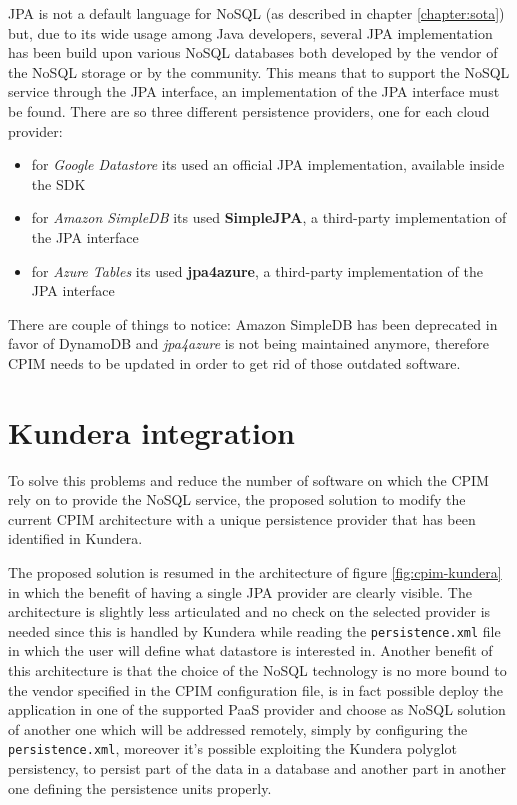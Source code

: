 \newparagraph JPA is not a default language for NoSQL (as described in chapter \ref{chapter:sota}) but, due to its wide usage among Java developers, several JPA implementation has been build upon various NoSQL databases both developed by the vendor of the NoSQL storage or by the community.
This means that to support the NoSQL service through the JPA interface, an implementation of the JPA interface must be found. There are so three different persistence providers, one for each cloud provider:
\begin{itemize}
\item for \textit{Google Datastore} its used an official JPA implementation, available inside the SDK
\item for \textit{Amazon SimpleDB} its used \textbf{SimpleJPA}, a third-party implementation of the JPA interface
\item for \textit{Azure Tables} its used \textbf{jpa4azure}, a third-party implementation of the JPA interface
\end{itemize}

\noindent There are couple of things to notice: Amazon SimpleDB has been deprecated in favor of DynamoDB and \textit{jpa4azure} is not being maintained anymore, therefore CPIM needs to be updated in order to get rid of those outdated software.

\section{Kundera integration}
To solve this problems and reduce the number of software on which the CPIM rely on to provide the NoSQL service, the proposed solution  to modify the current CPIM architecture with a unique persistence provider that has been identified in Kundera.

\newparagraph The proposed solution is resumed in the architecture of figure \ref{fig:cpim-kundera} in which the benefit of having a single JPA provider are clearly visible. The architecture is slightly less articulated and no check on the selected provider is needed since this is handled by Kundera while reading the \texttt{persistence.xml} file in which the user will define what datastore is interested in.
Another benefit of this architecture is that the choice of the NoSQL technology is no more bound to the vendor specified in the CPIM configuration file, is in fact possible deploy the application in one of the supported PaaS provider and choose as NoSQL solution of another one which will be addressed remotely, simply by configuring the \texttt{persistence.xml}, moreover it's possible exploiting the Kundera polyglot persistency, to persist part of the data in a database and another part in another one defining the persistence units properly.


